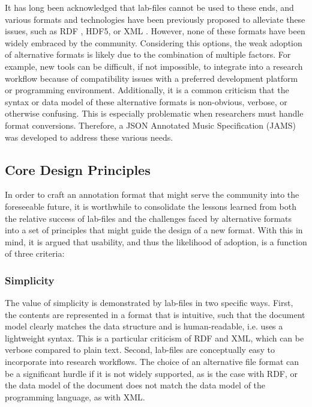 \noindent It has long been acknowledged that lab-files cannot be used to these ends, and various formats and technologies have been previously proposed to alleviate these issues, such as RDF \cite{cannam2006sonic}, HDF5\cite{bertin2011million}, or XML \cite{mckay2005ace}.
However, none of these formats have been widely embraced by the community.
Considering this options, the weak adoption of alternative formats is likely due to the combination of multiple factors.
For example, new tools can be difficult, if not impossible, to integrate into a research workflow because of compatibility issues with a preferred development platform or programming environment.
Additionally, it is a common criticism that the syntax or data model of these alternative formats is non-obvious, verbose, or otherwise confusing.
This is especially problematic when researchers must handle format conversions.
Therefore, a JSON Annotated Music Specification (JAMS) was developed to address these various needs.


\subsection{Core Design Principles}
\label{subsec:design}

In order to craft an annotation format that might serve the community into the foreseeable future, it is worthwhile to consolidate the lessons learned from both the relative success of lab-files and the challenges faced by alternative formats into a set of principles that might guide the design of a new format.
With this in mind, it is argued that usability, and thus the likelihood of adoption, is a function of three criteria:

\subsubsection{Simplicity}
\label{subsubsec:simplicity}
The value of simplicity is demonstrated by lab-files in two specific ways.
First, the contents are represented in a format that is intuitive, such that the document model clearly matches the data structure and is human-readable, i.e. uses a lightweight syntax.
This is a particular criticism of RDF and XML, which can be verbose compared to plain text.
Second, lab-files are conceptually easy to incorporate into research workflows.
The choice of an alternative file format can be a significant hurdle if it is not widely supported, as is the case with RDF, or the data model of the document does not match the data model of the programming language, as with XML.

